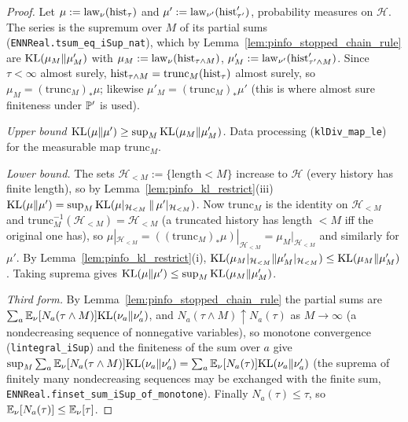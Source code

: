 \begin{proof}
\leanok
Let $\mu := \mathrm{law}_\nu(\mathrm{hist}_\tau)$ and $\mu' := \mathrm{law}_{\nu'}(\mathrm{hist}'_{\tau'})$,
probability measures on $\mathcal H$. The series is the supremum over $M$ of its partial sums
(\texttt{ENNReal.tsum\_eq\_iSup\_nat}), which by Lemma~\ref{lem:pinfo_stopped_chain_rule} are
$\mathrm{KL}(\mu_M\|\mu'_M)$ with $\mu_M := \mathrm{law}_\nu(\mathrm{hist}_{\tau\wedge M})$,
$\mu'_M := \mathrm{law}_{\nu'}(\mathrm{hist}'_{\tau'\wedge M})$. Since $\tau < \infty$ almost surely,
$\mathrm{hist}_{\tau\wedge M} = \mathrm{trunc}_M(\mathrm{hist}_\tau)$ almost surely, so
$\mu_M = (\mathrm{trunc}_M)_*\mu$; likewise $\mu'_M = (\mathrm{trunc}_M)_*\mu'$ (this is where
almost sure finiteness under $\mathbb{P}'$ is used).

\emph{Upper bound $\mathrm{KL}(\mu\|\mu') \ge \sup_M\mathrm{KL}(\mu_M\|\mu'_M)$.} Data processing
(\texttt{klDiv\_map\_le}) for the measurable map $\mathrm{trunc}_M$.

\emph{Lower bound.} The sets $\mathcal H_{<M} := \{\text{length} < M\}$ increase to $\mathcal H$
(every history has finite length), so by Lemma~\ref{lem:pinfo_kl_restrict}(iii)
$\mathrm{KL}(\mu\|\mu') = \sup_M \mathrm{KL}(\mu|_{\mathcal H_{<M}}\,\|\,\mu'|_{\mathcal H_{<M}})$. Now
$\mathrm{trunc}_M$ is the identity on $\mathcal H_{<M}$ and
$\mathrm{trunc}_M^{-1}(\mathcal H_{<M}) = \mathcal H_{<M}$ (a truncated history has length
$< M$ iff the original one has), so $\mu|_{\mathcal H_{<M}} = ((\mathrm{trunc}_M)_*\mu)|_{\mathcal H_{<M}}
= \mu_M|_{\mathcal H_{<M}}$ and similarly for $\mu'$. By Lemma~\ref{lem:pinfo_kl_restrict}(i),
$\mathrm{KL}(\mu_M|_{\mathcal H_{<M}}\|\mu'_M|_{\mathcal H_{<M}}) \le \mathrm{KL}(\mu_M\|\mu'_M)$. Taking suprema
gives $\mathrm{KL}(\mu\|\mu') \le \sup_M\mathrm{KL}(\mu_M\|\mu'_M)$.

\emph{Third form.} By Lemma~\ref{lem:pinfo_stopped_chain_rule} the partial sums are
$\sum_a\mathbb{E}_\nu[N_a(\tau\wedge M)]\mathrm{KL}(\nu_a\|\nu'_a)$, and $N_a(\tau\wedge M) \uparrow N_a(\tau)$
as $M \to \infty$ (a nondecreasing sequence of nonnegative variables), so monotone convergence
(\texttt{lintegral\_iSup}) and the finiteness of the sum over $a$ give
$\sup_M \sum_a\mathbb{E}_\nu[N_a(\tau\wedge M)]\mathrm{KL}(\nu_a\|\nu'_a) = \sum_a\mathbb{E}_\nu[N_a(\tau)]\mathrm{KL}(\nu_a\|\nu'_a)$
(the suprema of finitely many nondecreasing sequences may be exchanged with the finite sum,
\texttt{ENNReal.finset\_sum\_iSup\_of\_monotone}). Finally $N_a(\tau) \le \tau$, so
$\mathbb{E}_\nu[N_a(\tau)] \le \mathbb{E}_\nu[\tau]$.
\end{proof}

